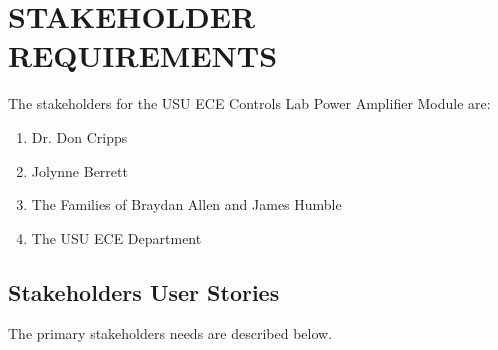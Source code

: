 \section{STAKEHOLDER REQUIREMENTS} %

The stakeholders for the USU ECE Controls Lab Power Amplifier Module are:

\begin{enumerate}
	\item Dr. Don Cripps
	\item Jolynne Berrett
	\item The Families of Braydan Allen and James Humble
	\item The USU ECE Department
\end{enumerate}

\subsection{Stakeholders User Stories}

The primary stakeholders needs are described below.

